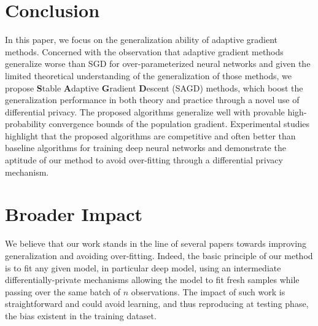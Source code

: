 \documentclass[11pt]{article}
\begin{document}
\section{Conclusion}\label{sec: conclusion}


In this paper, we focus on the generalization ability of adaptive gradient methods. 
Concerned with the observation that adaptive gradient methods generalize worse than SGD for over-parameterized neural networks and given the limited theoretical understanding of the generalization of those methods,
we propose \textbf{S}table \textbf{A}daptive \textbf{G}radient \textbf{D}escent (\textsc{SAGD}) methods, which boost the generalization performance in both theory and practice through a novel use of differential privacy. 
The proposed algorithms generalize well with provable high-probability convergence bounds of the population gradient. 
Experimental studies highlight that the proposed algorithms are competitive and often better than baseline algorithms for training deep neural networks and demonstrate the aptitude of our method to avoid over-fitting through a differential privacy mechanism.

\clearpage

\section{Broader Impact}
We believe that our work stands in the line of several papers towards improving generalization and avoiding over-fitting.
Indeed, the basic principle of our method is to fit any given model, in particular deep model, using an intermediate differentially-private mechanisms allowing the model to fit fresh samples while passing over the same batch of $n$ observations.
The impact of such work is straightforward and could avoid learning, and thus reproducing at testing phase, the bias existent in the training dataset.






\clearpage


\appendix
%



%
\end{document}
